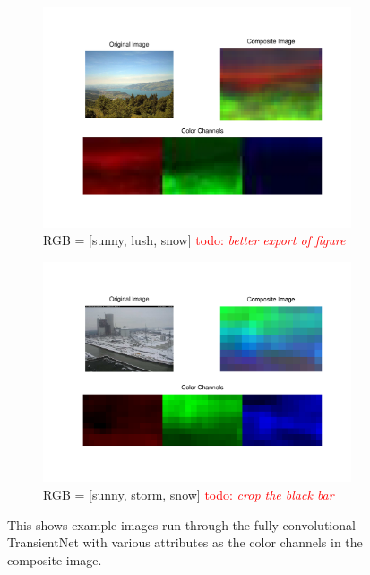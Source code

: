 \documentclass[10pt,twocolumn,letterpaper]{article}
\newcommand{\todo}[1]{\textcolor{red}{todo: {\em #1}}}
\begin{document}
\begin{figure}
  \centering
  \begin{subfigure}[b]{0.49\textwidth}
    \centering
		\includegraphics[width=\textwidth, trim= 15mm 17mm 10mm 10mm]{figs/false_color_7371.pdf}
    \caption{RGB = [sunny, lush, snow]
             \todo{better export of figure}}
    \label{fig:false_color_1}
  \end{subfigure}
  \begin{subfigure}[b]{0.49\textwidth}
    \centering
		\includegraphics[width=\textwidth, trim= 15mm 17mm 10mm 10mm]{figs/false_color_82.pdf}
    \caption{RGB = [sunny, storm, snow] 
             \todo{crop the black bar}}
    \label{fig:false_color_2}
  \end{subfigure}
  \caption{This shows example images run through the fully convolutional
           TransientNet with various attributes as the color channels in the composite
           image.}
  \label{fig:false_color_ims}
\end{figure}
\end{document}
